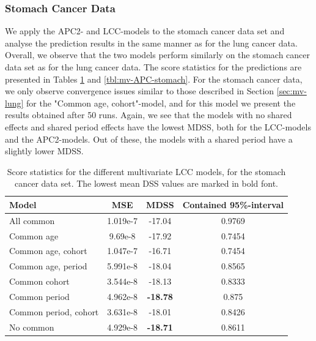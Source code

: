 \newpage
\subsubsection{Stomach Cancer Data}
We apply the APC2- and LCC-models to the stomach cancer data set and analyse the prediction results in the same manner as for the lung cancer data. Overall, we observe that the two models perform similarly on the stomach cancer data set as for the lung cancer data. The score statistics for the predictions are presented in Tables \ref{tbl:mv-LCC-stomach} and \ref{tbl:mv-APC-stomach}. For the stomach cancer data, we only observe convergence issues similar to those described in Section \ref{sec:mv-lung} for the "Common age, cohort"-model, and for this model we present the results obtained after 50 runs. Again, we see that the models with no shared effects and shared period effects have the lowest MDSS, both for the LCC-models and the APC2-models. Out of these, the models with a shared period have a slightly lower MDSS.  

\begin{table}
    \begin{center}
        \begin{tabular}{l |c c c }
            Model & MSE & MDSS & Contained 95\%-interval\\
            \hline
            All common            & 1.019e-7  & -17.04    & 0.9769 \\
            Common age            &  9.69e-8 & -17.92    & 0.7454 \\
            Common age, cohort   & 1.047e-7 & -16.71   & 0.7454 \\
            Common age, period    & 5.991e-8 & -18.04    & 0.8565 \\
            Common cohort         &  3.544e-8 & -18.13   & 0.8333 \\
            Common period         &  4.962e-8 & \textbf{-18.78}   & 0.875  \\
            Common period, cohort & 3.631e-8 & -18.01    & 0.8426 \\
            No common            &  4.929e-8 & \textbf{-18.71}    & 0.8611 \\
        \end{tabular}
        \caption{Score statistics for the different multivariate LCC models, for the stomach cancer data set. The lowest mean DSS values are marked in bold font. }\label{tbl:mv-LCC-stomach}
    \end{center}
\end{table}

